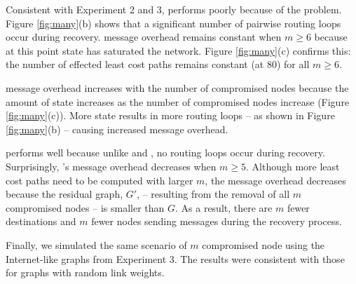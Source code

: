 Consistent with Experiment 2 and 3, \second performs poorly because of the \infinity problem. 
Figure \ref{fig:many}(b) shows that a significant number of pairwise routing loops occur during \second recovery.  
\second message overhead remains constant when $m \geq 6$ because at this point \badvector state has saturated the network.  
Figure \ref{fig:many}(c) confirms this: the number of effected least cost paths remains constant (at $80$) for 
all $m \geq 6$. 


\cpr message overhead increases with the number of compromised nodes because the amount of \oldvector state increases as the number of compromised nodes increase (Figure \ref{fig:many}(c)). 
More \oldvector state results in more routing loops -- as shown in Figure \ref{fig:many}(b) -- causing increased message overhead.

\purge performs well because unlike \cpr and \seconds, no routing loops occur during recovery. %
Surprisingly, \purges's message overhead decreases when $m \geq 5$.  Although more 
least cost paths need to be computed with larger $m$, the message overhead decreases because the residual graph, $G'$, -- resulting from the removal of all $m$ compromised nodes -- is 
smaller than $G$.  As a result, there are $m$ fewer destinations and $m$ fewer nodes sending messages during the recovery process.

Finally, we simulated the same scenario of $m$ compromised node using the Internet-like graphs from Experiment 3. 
The results were consistent with those for \er graphs with random link weights. %




